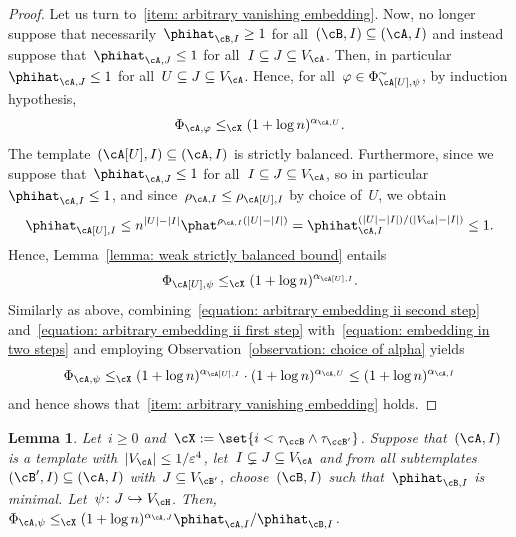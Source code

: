 \documentclass[11pt]{amsart}
\newcommand{\eps}{\varepsilon}
\DeclarePairedDelimiter{\abs}{\lvert}{\rvert}
\newcommand{\Xleq}{\leq_{\cX}}
\def\phi{\varphi}
\newcommand{\injection}{\hookrightarrow}
\newtheorem{lemma}[algocf]{Lemma}
\theoremstyle{definition}
\numberwithin{equation}{section}
\begin{document}
\begin{proof}
		Let us turn to~\ref{item: arbitrary vanishing embedding}.
		Now, no longer suppose that necessarily~$\phihat_{\cB,I}\geq 1$ for all~$(\cB,I)\subseteq (\cA,I)$ and instead suppose that~$\phihat_{\cA,J}\leq 1$ for all~$I\subseteq J\subseteq V_\cA$.
		Then, in particular~$\phihat_{\cA,J}\leq 1$ for all~$U\subseteq J\subseteq V_\cA$.
		Hence, for all~$\phi\in\Phi_{\cA[U],\psi}^\sim$, by induction hypothesis,
		\begin{equation}\label{equation: arbitrary embedding ii second step}
			\Phi_{\cA,\phi}\Xleq (1+\log n)^{\alpha_{\cA,U}}.
		\end{equation}
		The template~$(\cA[U],I)\subseteq (\cA,I)$ is strictly balanced.
		Furthermore, since we suppose that~$\phihat_{\cA,J}\leq 1$ for all~$I\subseteq J\subseteq V_\cA$, so in particular~$\phihat_{\cA,I}\leq 1$, and since~$\rho_{\cA,I}\leq \rho_{\cA[U],I}$ by choice of~$U$, we obtain
		\begin{equation*}
			\phihat_{\cA[U],I}
			\leq n^{\abs{U}-\abs{I}}\phat^{\rho_{\cA,I}(\abs{U}-\abs{I})}
			= \phihat_{\cA,I}^{(\abs{U}-\abs{I})/(\abs{V_\cA}-\abs{I})}
			\leq 1.
		\end{equation*}
		Hence, Lemma~\ref{lemma: weak strictly balanced bound} entails
		\begin{equation}\label{equation: arbitrary embedding ii first step}
			\Phi_{\cA[U],\psi}
			\Xleq (1+\log n)^{\alpha_{\cA[U],I}}.
		\end{equation}
		Similarly as above, combining~\eqref{equation: arbitrary embedding ii second step} and~\eqref{equation: arbitrary embedding ii first step} with~\eqref{equation: embedding in two steps} and employing Observation~\ref{observation: choice of alpha} yields
		\begin{equation*}
			\Phi_{\cA,\psi}
			\Xleq (1+\log n)^{\alpha_{\cA[U],I}}\cdot (1+\log n)^{\alpha_{\cA,U}}
			\leq(1+\log n)^{\alpha_{\cA,I}}
		\end{equation*}
		and hence shows that~\ref{item: arbitrary vanishing embedding} holds.
	\end{proof}
	
	\begin{lemma}\label{lemma: arbitrary embedding split}
		Let~$i\geq 0$ and~$\cX:=\set{i<\tau_\ccB\wedge\tau_{\ccB'} }$.
		Suppose that~$(\cA,I)$ is a template with~$\abs{V_\cA}\leq 1/\eps^4$, let~$I\subsetneq J\subseteq V_\cA$ and from all subtemplates~$(\cB',I)\subseteq(\cA,I)$ with~$J\subseteq V_{\cB'}$, choose~$(\cB,I)$ such that~$\phihat_{\cB,I}$ is minimal.
		Let~$\psi\colon J\injection V_\cH$.
		Then,~$\Phi_{\cA,\psi}\Xleq (1+\log n)^{\alpha_{\cA,J}}\phihat_{\cA,I}/\phihat_{\cB,I}$.
	\end{lemma}
	
\end{document}
